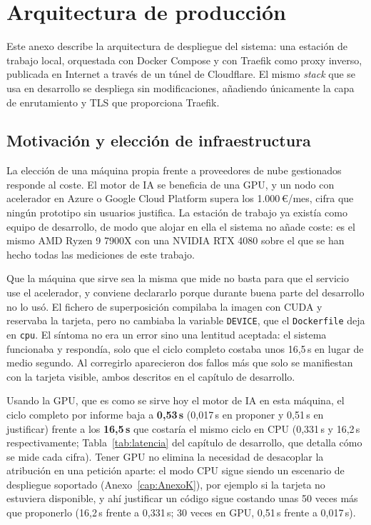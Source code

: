 \chapter{Arquitectura de producción}
\label{cap:AnexoI}

Este anexo describe la arquitectura de despliegue del sistema: una estación de trabajo local, orquestada con Docker Compose y con Traefik como proxy inverso, publicada en Internet a través de un túnel de Cloudflare. El mismo \emph{stack} que se usa en desarrollo se despliega sin modificaciones, añadiendo únicamente la capa de enrutamiento y TLS que proporciona Traefik.

\section{Motivación y elección de infraestructura}

La elección de una máquina propia frente a proveedores de nube gestionados responde al coste. El motor de IA se beneficia de una GPU, y un nodo con acelerador en Azure o Google Cloud Platform supera los 1.000\,€/mes, cifra que ningún prototipo sin usuarios justifica. La estación de trabajo ya existía como equipo de desarrollo, de modo que alojar en ella el sistema no añade coste: es el mismo AMD Ryzen 9 7900X con una NVIDIA RTX 4080 sobre el que se han hecho todas las mediciones de este trabajo.

Que la máquina que sirve sea la misma que mide no basta para que el servicio use el acelerador, y conviene declararlo porque durante buena parte del desarrollo no lo usó. El fichero de superposición compilaba la imagen con CUDA y reservaba la tarjeta, pero no cambiaba la variable \texttt{DEVICE}, que el \texttt{Dockerfile} deja en \texttt{cpu}. El síntoma no era un error sino una lentitud aceptada: el sistema funcionaba y respondía, solo que el ciclo completo costaba unos 16,5\,s en lugar de medio segundo. Al corregirlo aparecieron dos fallos más que solo se manifiestan con la tarjeta visible, ambos descritos en el capítulo de desarrollo.

Usando la GPU, que es como se sirve hoy el motor de IA en esta máquina, el ciclo completo por informe baja a \textbf{0,53\,s} (0,017\,s en proponer y 0,51\,s en justificar) frente a los \textbf{16,5\,s} que costaría el mismo ciclo en CPU (0,331\,s y 16,2\,s respectivamente; Tabla~\ref{tab:latencia} del capítulo de desarrollo, que detalla cómo se mide cada cifra). Tener GPU no elimina la necesidad de desacoplar la atribución en una petición aparte: el modo CPU sigue siendo un escenario de despliegue soportado (Anexo~\ref{cap:AnexoK}), por ejemplo si la tarjeta no estuviera disponible, y ahí justificar un código sigue costando unas 50 veces más que proponerlo (16,2\,s frente a 0,331\,s; 30 veces en GPU, 0,51\,s frente a 0,017\,s).

